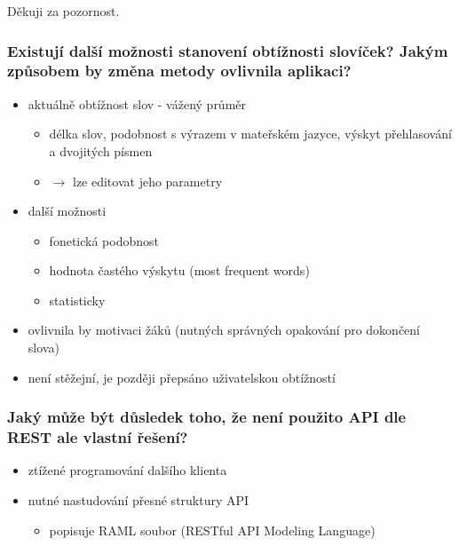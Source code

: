 \begin{frame}
\begin{center}
\label{lastslide}
\huge Děkuji za pozornost.
\end{center}
\end{frame}

\begin{frame}[noframenumbering]
    \frametitle{Existují další možnosti stanovení obtížnosti slovíček? Jakým způsobem by změna metody ovlivnila aplikaci?}

    \begin{itemize}
        \item aktuálně obtížnost slov - vážený průměr
        \begin{itemize}
            \item délka slov, podobnost s výrazem v mateřském jazyce, výskyt přehlasování a dvojitých písmen
            \item $\rightarrow$ lze editovat jeho parametry
        \end{itemize}
        \item další možnosti
        \begin{itemize}
            \item fonetická podobnost
            \item hodnota častého výskytu (most frequent words)
            \item statisticky
        \end{itemize}
        \item ovlivnila by motivaci žáků (nutných správných opakování pro dokončení slova)
        \item není stěžejní, je později přepsáno uživatelskou obtížností
    \end{itemize}
\end{frame}

\begin{frame}[noframenumbering]
    \frametitle{Jaký může být důsledek toho, že není použito API dle REST ale vlastní řešení?}
    \begin{itemize}
        \item ztížené programování dalšího klienta 
        \item nutné nastudování přesné struktury API 
        \begin{itemize}
            \item popisuje RAML soubor (RESTful API Modeling Language)
        \end{itemize}
    \end{itemize}
\end{frame}

